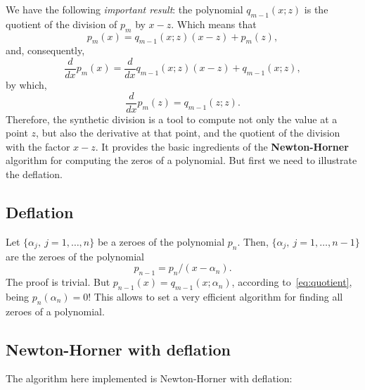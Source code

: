 \documentclass[10pt,a4paper]{article}
\theoremstyle{definition}%
\begin{document}
We have the following \emph{important result}: the polynomial $q_{m-1}(x;z)$ is the quotient of the division of $p_m$ by $x-z$. Which means that 
\begin{equation}
\label{eq:quotient}
\boxed{p_m(x)=q_{m-1}(x;z)(x-z) + p_m(z),}
\end{equation}
and, consequently,
\begin{equation}
\label{eq:quotientder}
\boxed{\frac{d}{dx}p_m(x)=\frac{d}{dx}q_{m-1}(x;z)(x-z) + q_{m-1}(x;z),}
\end{equation}
by which,
\begin{equation}
\label{eq:quotientdertwo}
\boxed{\frac{d}{dx}p_m(z)=q_{m-1}(z;z).}
\end{equation}
Therefore, the synthetic division is a tool to compute not only the value at a point $z$, but also the derivative at that point, and the quotient of the division with the factor $x-z$. It provides the basic ingredients of the \textbf{Newton-Horner} algorithm for computing the zeros of a polynomial. But first we need to illustrate the deflation.
\subsection{Deflation}
Let $\{\alpha_j,\ j=1,\ldots,n\}$ be a zeroes of the polynomial $p_n$. Then, $\{\alpha_j,\ j=1,\ldots,n-1\}$ are the zeroes of 
the polynomial
\begin{equation}
p_{n-1}=p_n/(x-\alpha_n).
\end{equation} 
The proof is trivial.
But $p_{n-1}(x)=q_{m-1}(x;\alpha_n)$, according to~\eqref{eq:quotient}, being $p_n(\alpha_n)=0$! This allows to set a very efficient algorithm for 
finding all zeroes of a polynomial.
\subsection{Newton-Horner with deflation}
The algorithm here implemented is Newton-Horner with deflation:
\end{document}

